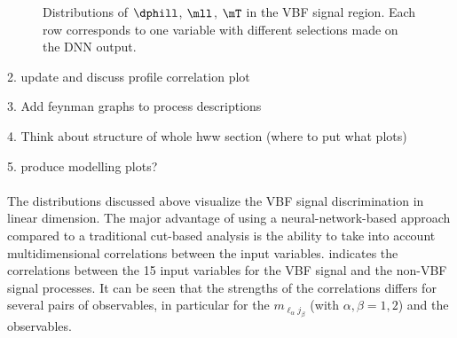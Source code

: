 \begin{figure}[h]
{        \label{fig:dnn-inputs-post-fit2-4}
    } 
    {\caption{Distributions of $\dphill$, $\mll$, $\mT$ in the VBF signal region.
        Each row corresponds to one variable with different selections made on the DNN output.
        \label{fig:dnn-inputs-post-fit2} }}
\end{figure}

\captionsetup[subfloat]{captionskip=7pt} %

2. update and discuss profile correlation plot

3. Add feynman graphs to process descriptions

4. Think about structure of whole hww section (where to put what plots)

5. produce modelling plots?



\paragraph{}
The distributions discussed above visualize the VBF signal discrimination in linear dimension. The major advantage of using a neural-network-based approach compared to a traditional cut-based analysis is the ability to take into account multidimensional correlations between the input variables.  indicates the correlations between the 15 input variables for the VBF signal and the non-VBF signal processes. It can be seen that the strengths of the correlations differs for several pairs of observables, in particular for the $m_{\ell_\alpha j_\beta}$ (with $\alpha, \beta = 1, 2$) and the \pTjthree observables.

